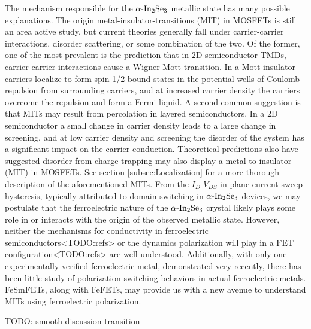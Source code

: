 The mechanism responsible for the $\textrm{\ensuremath{\alpha}-In}_{2}\textrm{Se}_{3}$
metallic state has many possible explanations. The origin metal-insulator-transitions
(MIT) in MOSFETs is still an area active study\citep{moon2021metalinsulator},
but current theories generally fall under carrier-carrier interactions,
disorder scattering, or some combination of the two. Of the former,
one of the most prevalent is the prediction that in 2D semiconductor
TMDs, carrier-carrier interactions cause a Wigner-Mott transition\citep{amaricci2010extended,moon2021metalinsulator,moon2020quantum}.
In a Mott insulator carriers localize to form spin 1/2 bound states
in the potential wells of Coulomb repulsion from surrounding carriers,
and at increased carrier density the carriers overcome the repulsion
and form a Fermi liquid. A second common suggestion is that MITs may
result from percolation in layered semiconductors\citep{moon2019anomalous,tracy2009observation,moon2021metalinsulator,manfra2007transport,dassarma2005twodimensional}.
In a 2D semiconductor a small change in carrier density leads to a
large change in screening, and at low carrier density and screening
the disorder of the system has a significant impact on the carrier
conduction. Theoretical predictions also have suggested disorder from
charge trapping may also display a metal-to-insulator (MIT) in MOSFETs\citep{brunthaler2007trapmodel,altshuler1999theoryof,hormann2010dipoletrap}.
See section \ref{subsec:Localization} for a more thorough description
of the aforementioned MITs. From the $I_{D}$-$V_{DS}$ in plane current
sweep hysteresis, typically attributed to domain switching in $\textrm{\ensuremath{\alpha}-In}_{2}\textrm{Se}_{3}$
devices, we may postulate that the ferroelectric nature of the $\textrm{\ensuremath{\alpha}-In}_{2}\textrm{Se}_{3}$
crystal likely plays some role in or interacts with the origin of
the observed metallic state. However, neither the mechanisms for conductivity
in ferroelectric semiconductors<TODO:refs> or the dynamics polarization
will play in a FET configuration<TODO:refs> are well understood. Additionally,
with only one experimentally verified ferroelectric metal\citep{zhou2020reviewon},
demonstrated very recently\citep{sharma2019aroomtemperature,fei2018ferroelectric},
there has been little study of polarization switching behaviors in
actual ferroelectric metals. FeSmFETs, along with FeFETs\citep{lu2018electrically},
may provide us with a new avenue to understand MITs using ferroelectric
polarization. 

TODO: smooth discussion transition

